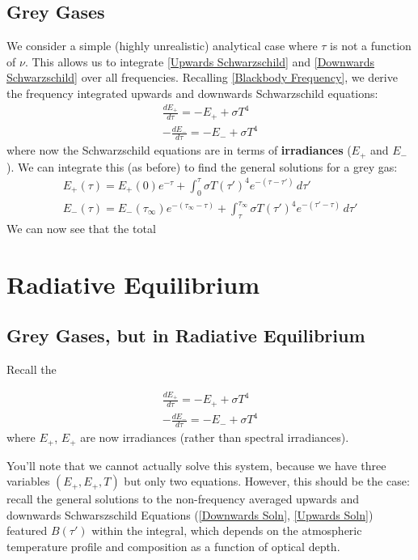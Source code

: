 \section{Grey Gases}

We consider a simple (highly unrealistic) analytical case where $\tau$ is not a function of $\nu$. This allows us to integrate \ref{Upwards Schwarzschild} and \ref{Downwards Schwarzschild} over all frequencies. Recalling \ref{Blackbody Frequency}, we derive the frequency integrated upwards and downwards Schwarzschild equations:
\begin{align}
    \frac{dE_+}{d\tau}=-E_++\sigma T^4 \label{Upwards Grey}\\
    -\frac{dE_-}{d\tau}=-E_-+\sigma T^4\label{Downwards Grey}
\end{align}
where now the Schwarzschild equations are in terms of \textbf{irradiances} ($E_+$ and $E_-$). We can integrate this (as before) to find the general solutions for a grey gas:
\begin{align}
    E_+(\tau)=E_+(0)e^{-\tau}+
    \int_0^{\tau}
    \sigma T(\tau')^4
    e^{-(\tau-\tau')}
    \,d\tau'\label{Upwards Soln Grey General}
    \\
    E_-(\tau)=E_-(\tau_\infty)
    e^{-(\tau_\infty-\tau)}
    +
    \int_{\tau}^{\tau_\infty}
    \sigma T(\tau')^4
    e^{-(\tau'-\tau)}
    \,d\tau' 
    \label{Downwards Soln Grey General}
\end{align}
We can now see that the total 

 
\chapter{Radiative Equilibrium}

\section{Grey Gases, but in Radiative Equilibrium}

Recall the 

\begin{align*}
    \frac{dE_+}{d\tau}=-E_++\sigma T^4 \\
    -\frac{dE_-}{d\tau}=-E_-+\sigma T^4
\end{align*}
where $E_+$, $E_+$ are now irradiances (rather than spectral irradiances).

You'll note that we cannot actually solve this system, because we have three variables $(E_+,E_+,T)$ but only two equations. However, this should be the case: recall the general solutions to the non-frequency averaged upwards and downwards Schwarszschild Equations (\ref{Downwards Soln}, \ref{Upwards Soln}) featured $B(\tau')$ within the integral, which depends on the atmospheric temperature profile and composition as a function of optical depth. 

